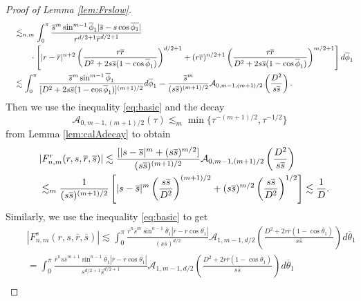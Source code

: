 \documentclass[11pt]{amsart}
\theoremstyle{definition}
\theoremstyle{remark}
\numberwithin{equation}{section}
\numberwithin{equation}{section}
\newcommand{\br}[1]{\overline{#1}}
\newcommand{\0}{\emptyset}
\newcommand{\tht}{\theta}
\newcommand{\calA}{\mathcal A}
\begin{document}
\begin{proof}[Proof of Lemma \ref{lem:Frslow}]
\begin{equation}
\begin{aligned}
				\quad&\lesssim _{n,m}%
				\int_{0}^{\pi}\frac{\br{s}^{m}\sin^{m-1}\br{\phi}_{1}|\br{s}-s\cos\br{\phi_{1}}|}{r^{d/2+1}\br{r}^{d/2+1}}\\
				&\qquad\cdot\left[|r-\br{r}|^{n+2}\left( \frac{r\br{r}}{D^{2}+2s\br{s}(1-\cos\br{\phi}_{1})}\right)^{d/2+1}+(r\br{r})^{n/2+1} \left( \frac{r\br{r}}{D^{2}+2s\br{s}(1-\cos\br{\phi}_{1})}\right)^{m/2+1}\right]d\br{\phi}_{1}\\
				\quad&\lesssim \int_{0}^{\pi}\frac{%
					\br{s}^{m}\sin^{m-1}\br{\phi}_{1}}{[D^{2}+2s\br{s}(1-\cos\br{\phi}_{1})]^{(m+1)/2}}d\br{\phi}_{1}=\frac{\br{s}^{m}}{(s\br{s})^{(m+1)/2}}\calA_{0,m-1,(m+1)/2}\left(\frac{D^{2}}{s\br{s}}\right).
			\end{aligned}
		\end{equation}
		Then we use the inequality \eqref{eq:basic} and the decay
		\begin{equation}
			\calA_{0,m-1,(m+1)/2}(\tau)\lesssim_{m} \min\{ \tau^{-(m+1)/2},\tau^{-1/2}\}
		\end{equation}
		from Lemma \ref{lem:calAdecay} to obtain
		\begin{equation}
			\begin{aligned}
				&|F_{n,m}^{r}(r,s,\br{r},\br{s})|\lesssim \frac{[|s-\br{s}|^{m}+(s\br{s})^{m/2}]}{(s\br{s})^{(m+1)/2}}\calA_{0,m-1,(m+1)/2}\left(\frac{D^{2}}{s\br{s}}\right)%
				\\
				\quad&\lesssim_{m} \frac{%
					1}{(s\br{s})^{(m+1)/2}}\left[|s-\br{s}|^{m}\left(\frac{s\br{s}}{D^{2}}\right)^{(m+1)/2}+(s\br{s})^{m/2}\left(\frac{s\br{s}}{D^{2}}\right)^{1/2}\right]\lesssim \frac{1%
				}{D}.
			\end{aligned}
		\end{equation}
		Similarly, we use the inequality \eqref{eq:basic} to get
		\begin{equation}
			\begin{aligned}
				&|F_{n,m}^{s}(r,s,\br{r},\br{s})|\lesssim \int_{0}^{\pi}\frac{\br{r}^{n}\br{s}^{m}\sin^{n-1}\br{\tht}_{1}|\br{r}-r\cos\br{\tht_{1}}|}{(s\br{s})^{d/2}}%
				\calA_{1,m-1,d/2}\left(\frac{D^{2}+2r\br{r}(1-\cos\br{\tht}_{1})}{s\br{s}}\right)d\br{\tht}_{1}\\
				\quad&=\int_{0}^{\pi}\frac{\br{r}^{n}s\br{s}^{m+1}\sin^{n-1}\br{\tht}_{1}|\br{r}-r\cos\br{\tht_{1}}|}{s^{d/2+1}\br{s}^{d/2+1}}\calA_{1,m-1,d/2}\left(\frac{D^{2}+2r\br{r}(1-\cos\br{\tht}_{1})}{s\br{s}}\right)d\br{\tht}_{1}\\

\end{aligned}
\end{equation}
\end{proof}
\end{document}
